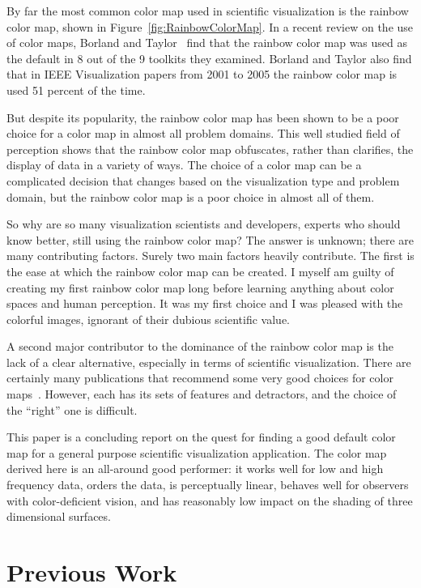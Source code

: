 \documentclass[twocolumn]{article}
\newcommand{\lcite}[1]{~\cite{#1}}
\newcommand{\scite}[1]{~\cite{#1}}
\begin{document}
By far the most common color map used in scientific visualization is the
rainbow color map, shown in Figure~\ref{fig:RainbowColorMap}.  In a recent
review on the use of color maps, Borland and Taylor\scite{Borland07} find
that the rainbow color map was used as the default in 8 out of the 9
toolkits they examined.  Borland and Taylor also find that in IEEE
Visualization papers from 2001 to 2005 the rainbow color map is used 51
percent of the time.

But despite its popularity, the rainbow color map has been shown to be a
poor choice for a color map in almost all problem domains.  This well
studied field of perception shows that the rainbow color map obfuscates,
rather than clarifies, the display of data in a variety of ways.  The
choice of a color map can be a complicated decision that changes based on
the visualization type and problem domain, but the rainbow color map is a
poor choice in almost all of them.

So why are so many visualization scientists and developers, experts who
should know better, still using the rainbow color map?  The answer is
unknown; there are many contributing factors.  Surely two main factors
heavily contribute.  The first is the ease at which the rainbow color map
can be created.  I myself am guilty of creating my first rainbow color map
long before learning anything about color spaces and human perception.  It
was my first choice and I was pleased with the colorful images, ignorant of
their dubious scientific value.

A second major contributor to the dominance of the rainbow color map is the
lack of a clear alternative, especially in terms of scientific
visualization.  There are certainly many publications that recommend some
very good choices for color maps\lcite{Ware04,Brewer05}.  However, each has
its sets of features and detractors, and the choice of the ``right'' one is
difficult.

This paper is a concluding report on the quest for finding a good default
color map for a general purpose scientific visualization application.  The
color map derived here is an all-around good performer: it works well for
low and high frequency data, orders the data, is perceptually linear,
behaves well for observers with color-deficient vision, and has reasonably
low impact on the shading of three dimensional surfaces.


\section{Previous Work}
\label{sec:PreviousWork}
\end{document}
